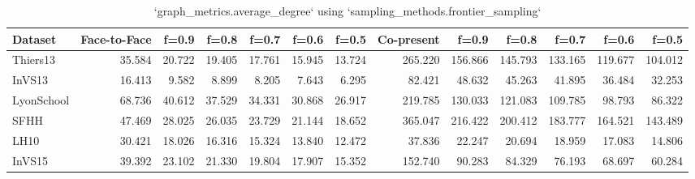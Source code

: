 \begin{table}[ht]
\begin{tabular}{lrrrrrrrrrrrr}
\hline
 Dataset    &   Face-to-Face &   f=0.9 &   f=0.8 &   f=0.7 &   f=0.6 &   f=0.5 &   Co-present &   f=0.9 &   f=0.8 &   f=0.7 &   f=0.6 &   f=0.5 \\
\hline
 Thiers13   &         35.584 &  20.722 &  19.405 &  17.761 &  15.945 &  13.724 &      265.220 & 156.866 & 145.793 & 133.165 & 119.677 & 104.012 \\
 InVS13     &         16.413 &   9.582 &   8.899 &   8.205 &   7.643 &   6.295 &       82.421 &  48.632 &  45.263 &  41.895 &  36.484 &  32.253 \\
 LyonSchool &         68.736 &  40.612 &  37.529 &  34.331 &  30.868 &  26.917 &      219.785 & 130.033 & 121.083 & 109.785 &  98.793 &  86.322 \\
 SFHH       &         47.469 &  28.025 &  26.035 &  23.729 &  21.144 &  18.652 &      365.047 & 216.422 & 200.412 & 183.777 & 164.521 & 143.489 \\
 LH10       &         30.421 &  18.026 &  16.316 &  15.324 &  13.840 &  12.472 &       37.836 &  22.247 &  20.694 &  18.959 &  17.083 &  14.806 \\
 InVS15     &         39.392 &  23.102 &  21.330 &  19.804 &  17.907 &  15.352 &      152.740 &  90.283 &  84.329 &  76.193 &  68.697 &  60.284 \\
\hline
\end{tabular}
\caption{`graph_metrics.average_degree` using `sampling_methods.frontier_sampling`}
\end{table}